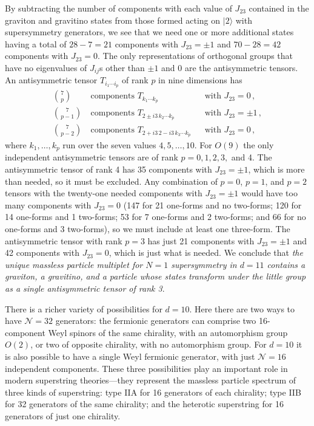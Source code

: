 By subtracting the number of components with each value of \(J_{23}\)
contained in the graviton and gravitino states from those formed acting
on \(\lvert2\rangle\) with supersymmetry generators, we see that we need
one or more additional states having a total of \(28-7=21\) components
with \(J_{23}=\pm1\) and \(70-28=42\) components with \(J_{23}=0\).
The only representations of orthogonal groups that have no eigenvalues
of \(J_{ij}\)s other than \(\pm1\) and 0 are the antisymmetric tensors. An
antisymmetric tensor \(T_{i_1\cdots i_p}\) of rank \(p\) in nine
dimensions has
\[
  \begin{aligned}
    \binom{7}{p}
      &\ \text{components }T_{k_1\cdots k_p}
      &&\text{with }J_{23}=0\,,\\
    \binom{7}{p-1}
      &\ \text{components }T_{2\pm i3\,k_2\cdots k_p}
      &&\text{with }J_{23}=\pm1\,,\\
    \binom{7}{p-2}
      &\ \text{components }T_{2+i3\,2-i3\,k_3\cdots k_p}
      &&\text{with }J_{23}=0\,,
  \end{aligned}
\]
where \(k_1,\ldots,k_p\) run over the seven values \(4,5,\ldots,10\).
For \(O(9)\) the only independent antisymmetric tensors are of rank
\(p=0,1,2,3,\) and 4. The antisymmetric tensor of rank 4 has 35
components with \(J_{23}=\pm1\), which is more than needed, so it must be
excluded. Any combination of \(p=0\), \(p=1\), and \(p=2\) tensors with
the twenty-one needed components with \(J_{23}=\pm1\) would have too many
components with \(J_{23}=0\) (147 for 21 one-forms and no two-forms; 120
for 14 one-forms and 1 two-forms; 53 for 7 one-forms and 2 two-forms; and
66 for no one-forms and 3 two-forms), so we must include at least one
three-form. The antisymmetric tensor with rank \(p=3\) has just 21
components with \(J_{23}=\pm1\) and 42 components with \(J_{23}=0\),
which is just what is needed. We conclude that \emph{the unique massless
particle multiplet for \(N=1\) supersymmetry in \(d=11\) contains a
graviton, a gravitino, and a particle whose states transform under the
little group as a single antisymmetric tensor of rank 3}.

There is a richer variety of possibilities for \(d=10\). Here there are
two ways to have \(\mathcal N=32\) generators: the fermionic generators
can comprise two 16-component Weyl spinors of the same chirality, with an
automorphism group \(O(2)\), or two of opposite chirality, with no
automorphism group. For \(d=10\) it is also possible to have a single
Weyl fermionic generator, with just \(\mathcal N=16\) independent
components. These three possibilities play an important role in modern
superstring theories---they represent the massless particle spectrum of
three kinds of superstring: type IIA for 16 generators of each chirality;
type IIB for 32 generators of the same chirality; and the heterotic
superstring for 16 generators of just one chirality.

